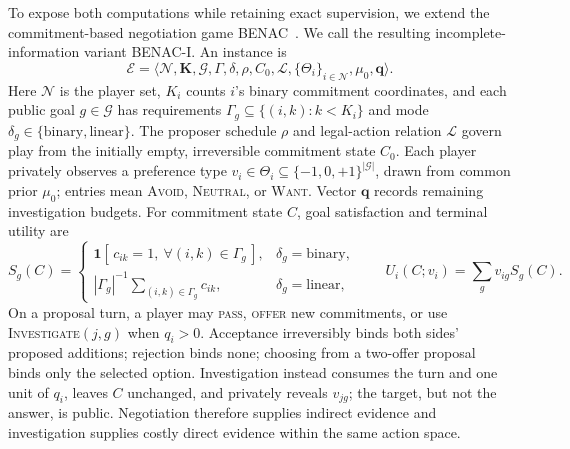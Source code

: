 To expose both computations while retaining exact supervision, we extend the
commitment-based negotiation game BENAC~\citep{benac2026benchmark}.  We call
the resulting incomplete-information variant \textsc{BENAC-I}.  An instance is
\begin{equation}
 \mathcal E=\langle\mathcal N,\mathbf K,\mathcal G,\Gamma,\delta,
 \rho,C_0,\mathcal L,\{\Theta_i\}_{i\in\mathcal N},\mu_0,\mathbf q\rangle .
 \label{eq:benac-i-game}
\end{equation}
Here $\mathcal N$ is the player set, $K_i$ counts $i$'s binary commitment
coordinates, and each public goal $g\in\mathcal G$ has requirements
$\Gamma_g\subseteq\{(i,k):k<K_i\}$ and mode
$\delta_g\in\{\mathrm{binary},\mathrm{linear}\}$.  The proposer schedule
$\rho$ and legal-action relation $\mathcal L$ govern play from the initially
empty, irreversible commitment state $C_0$.  Each player privately observes a
preference type $v_i\in\Theta_i\subseteq\{-1,0,+1\}^{|\mathcal G|}$, drawn
from common prior $\mu_0$; entries mean \textsc{Avoid}, \textsc{Neutral}, or
\textsc{Want}.  Vector $\mathbf q$ records remaining investigation budgets.
For commitment state $C$, goal satisfaction and terminal utility are
\begin{equation}
 S_g(C)=
 \begin{cases}
 \mathbf 1[\,c_{ik}=1,\ \forall(i,k)\in\Gamma_g\,],&\delta_g=\mathrm{binary},\\
 |\Gamma_g|^{-1}\sum_{(i,k)\in\Gamma_g}c_{ik},&\delta_g=\mathrm{linear},
 \end{cases}
 \qquad U_i(C;v_i)=\sum_g v_{ig}S_g(C).
 \label{eq:benac-i-utility}
\end{equation}
On a proposal turn, a player may \textsc{pass}, \textsc{offer} new commitments, or use
\textsc{Investigate}$(j,g)$ when $q_i>0$.  Acceptance irreversibly binds both
sides' proposed additions; rejection binds none; choosing from a two-offer
proposal binds only the selected option.  Investigation instead consumes the
turn and one unit of $q_i$, leaves $C$ unchanged, and privately reveals $v_{jg}$;
the target, but not the answer, is public.  Negotiation therefore supplies
indirect evidence and investigation supplies costly direct evidence within the
same action space.

